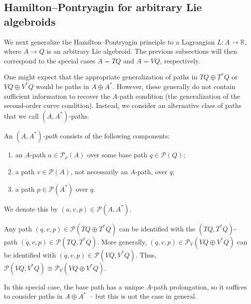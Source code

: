 \documentclass[10pt,a4paper]{amsart}
\numberwithin{equation}{section}
\begin{document}
\subsection{Hamilton--Pontryagin for arbitrary Lie algebroids}\label{sec:hpAlgebroids}

We next generalize the Hamilton--Pontryagin principle to a Lagrangian $ L \colon A \rightarrow \mathbb{R} $, where $A \rightarrow Q $ is an arbitrary Lie algebroid. The previous subsections will then correspond to the special cases $ A = T Q $ and $ A = V Q $, respectively.

One might expect that the appropriate generalization of paths in $ T Q \oplus T ^\ast Q $ or $ V Q \oplus V ^\ast Q $ would be paths in $ A \oplus A ^\ast $. However, these generally do not contain suf\/f\/icient information to recover the $A$-path condition (the generalization of the second-order curve condition). Instead, we consider an alternative class of paths that we call $ ( A, A ^\ast ) $-paths.

\begin{Definition} An \emph{$ ( A, A ^\ast ) $-path} consists of the following components:
\begin{enumerate}[label=(\roman*)]\itemsep=0pt
\item an $A$-path $ a \in \mathcal{P} _\rho (A) $ over some base path $ q \in \mathcal{P} (Q) $;
\item a path $ v \in \mathcal{P} (A) $, not necessarily an $A$-path, over $q$;
\item a path $ p \in \mathcal{P} ( A ^\ast ) $ over $q$.
\end{enumerate}
We denote this by $ ( a, v, p ) \in \mathcal{P} ( A, A ^\ast ) $.
\end{Definition}

\begin{Example}
Any path $ ( q, v, p ) \in \mathcal{P} ( T Q \oplus T ^\ast Q ) $ can be identif\/ied with the $ ( T Q, T ^\ast Q ) $-path $ ( \dot{q}, v, p ) \in \mathcal{P} ( T Q , T ^\ast Q ) $. More generally, $ ( q, v, p ) \in \mathcal{P} _V ( V Q \oplus V ^\ast Q ) $ can be identif\/ied with $ ( \dot{q}, v, p ) \in \mathcal{P} ( V Q , V ^\ast Q ) $. Thus, $ \mathcal{P} ( VQ , V ^\ast Q ) \cong \mathcal{P} _V ( V Q \oplus V ^\ast Q ) $.

In this special case, the base path has a unique $A$-path prolongation, so it suf\/f\/ices to consider paths in $ A \oplus A ^\ast $~-- but this is not the case in general.
\end{Example}
\end{document}

